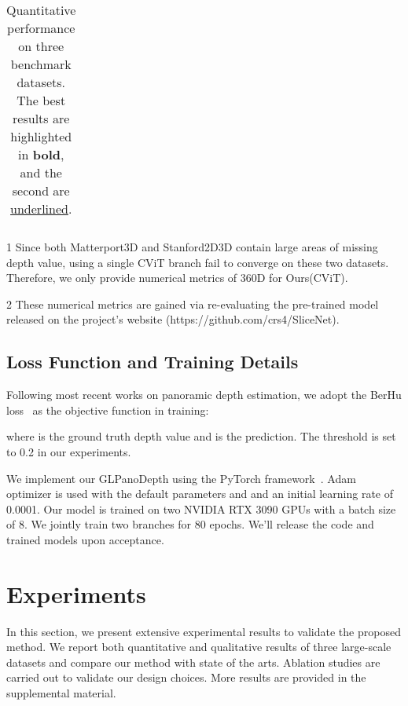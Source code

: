 \documentclass[10pt,twocolumn,letterpaper]{article}
\begin{document}
\begin{table*}[tp]
\begin{threeparttable}
\begin{tabular}{clcccccc}
    \bottomrule
    \end{tabular}
    \begin{tablenotes}
        \footnotesize
        \item[1] Since both Matterport3D and Stanford2D3D contain large areas of missing depth value, using a single CViT branch fail to converge on these two datasets. Therefore, we only provide numerical metrics of 360D for Ours(CViT).
        \item[2] These numerical metrics are gained via re-evaluating the pre-trained model released on the project's website (https://github.com/crs4/SliceNet).
      \end{tablenotes}
    \end{threeparttable}
      \caption{Quantitative performance on three benchmark datasets. The best results are highlighted in \textbf{bold}, and the second are \underline{underlined}.}
  \label{tab:performance_comparison}
\end{table*}

\subsection{Loss Function and Training Details}
Following most recent works on panoramic depth estimation, we adopt the BerHu loss~\cite{Laina_2016_3DV} as the objective function in training:

where  is the ground truth depth value and  is the prediction. The threshold  is set to 0.2 in our experiments.

We implement our GLPanoDepth using the PyTorch framework~\cite{pytorch}. Adam~\cite{kingma2017adam} optimizer is used with the default parameters  and  and an initial learning rate of 0.0001.
Our model is trained on two NVIDIA RTX 3090 GPUs with a batch size of 8. We jointly train two branches for 80 epochs. We'll release the code and trained models upon acceptance.


\section{Experiments}
In this section, we present extensive experimental results to validate the proposed method. We report both quantitative and qualitative results of three large-scale datasets and compare our method with state of the arts. Ablation studies are carried out to validate our design choices. More results are provided in the supplemental material.
\end{document}
